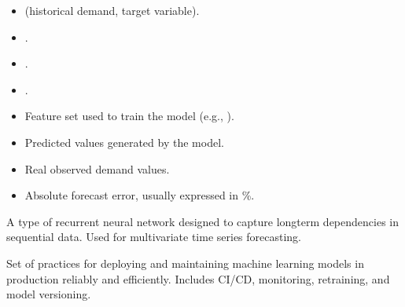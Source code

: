 \documentclass[letterpaper,10pt,english]{sphinxmanual}
\begin{document}
\begin{description}
\begin{itemize}
\end{itemize}

\begin{itemize}
\item {} 
\sphinxAtStartPar
{} \textendash{}  (historical demand, target variable).

\item {} 
\sphinxAtStartPar
{} \textendash{} .

\item {} 
\sphinxAtStartPar
{} \textendash{} .

\item {} 
\sphinxAtStartPar
{} \textendash{} .

\item {} 
\sphinxAtStartPar
{} \textendash{} Feature set used to train the model (e.g., ).

\item {} 
\sphinxAtStartPar
{} \textendash{} Predicted values generated by the model.

\item {} 
\sphinxAtStartPar
{} \textendash{} Real observed demand values.

\item {} 
\sphinxAtStartPar
{} \textendash{} Absolute forecast error, usually expressed in \%.

\end{itemize}

\sphinxAtStartPar
A type of recurrent neural network designed to capture long\sphinxhyphen{}term dependencies
in sequential data. Used for multivariate time series forecasting.

\sphinxAtStartPar
Set of practices for deploying and maintaining machine learning models in
production reliably and efficiently. Includes CI/CD, monitoring, retraining,
and model versioning.


\end{description}
\end{document}
